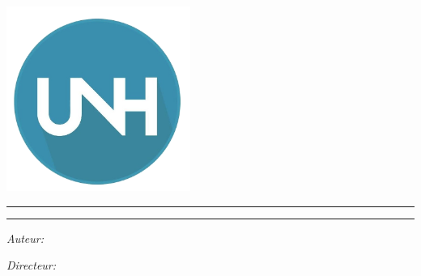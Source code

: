 
\begin{titlepage}

\begin{center}
\large

\vspace*{.06\textheight}


 
{\Huge{{\textsc{\myUni}}} }\\
\vspace{1.5cm} 
\includegraphics[width=6cm]{images/official_unh_logo1} \\ \medskip %


\begin{center}
	\rule{0.9\textwidth}{.2pt}
\end{center}
\vspace{0.2cm}
{\LARGE \bfseries {\myTitle}}%
\begin{center}
	\rule{0.9\textwidth}{.2pt}
\end{center}


\begin{minipage}[t]{0.5\textwidth}
	\begin{flushleft} \large
		\emph{Auteur:}\\
		\href{https://www.unhorizons.org}{\myName} %
	\end{flushleft}
\end{minipage}
\begin{minipage}[t]{0.4\textwidth}
	\begin{flushright} \large
		\emph{Directeur:} \\
		\href{https://www.unhorizons.org}{\myProf}  
	\end{flushright}
\end{minipage}\\[3cm]


\end{center}
\end{titlepage}
